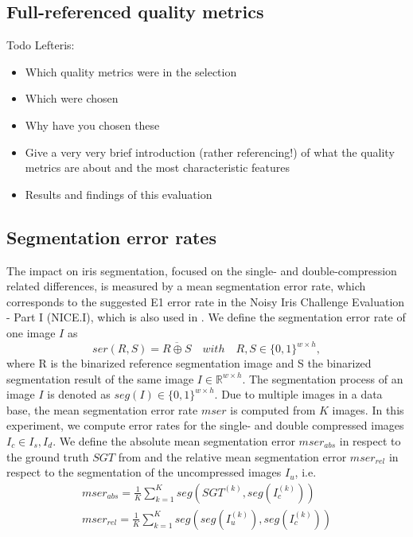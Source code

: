 \documentclass[10pt,twocolumn,letterpaper]{article}
\begin{document}
\subsection{Full-referenced quality metrics}
Todo Lefteris:
\begin{itemize}
 \item Which quality metrics were in the selection
 \item Which were chosen
 \item Why have you chosen these
 \item Give a very very brief introduction (rather referencing!) of what the quality metrics are about and the most characteristic features
 \item Results and findings of this evaluation
\end{itemize}

\subsection{Segmentation error rates}
The impact on iris segmentation, focused on the single- and double-compression related differences, is measured by a mean segmentation error rate, which corresponds to the suggested E1 error rate in the Noisy Iris Challenge Evaluation - Part I (NICE.I), which is also used in \cite{severeCompression}. We define the segmentation error rate of one image $I$ as
\begin{equation}
ser(R,S) = \overline{R \oplus S} \quad with \quad R,S \in \{0,1\}^{w \times h},
\end{equation} where R is the binarized reference segmentation image and S the binarized segmentation result of the same image $I \in \mathbb{R}^{w \times h}$. The segmentation process of an image $I$ is denoted as $seg(I) \in \{0,1\}^{w \times h}$. Due to multiple images in a data base, the mean segmentation error rate $mser$ is computed from $K$ images. In this experiment, we compute error rates for the single- and double compressed images $I_c \in {I_s, I_d}$. We define the absolute mean segmentation error $mser_{abs}$ in respect to the ground truth $SGT$ from \cite{severeCompression} and the relative mean segmentation error $mser_{rel}$ in respect to the segmentation of the uncompressed images $I_u$, i.e. 
\begin{eqnarray}
mser_{abs} = \frac{1}{K}\sum_{k=1}^{K}seg(SGT^{(k)},seg(I_c^{(k)})) \\
mser_{rel} = \frac{1}{K}\sum_{k=1}^{K}seg(seg(I_u^{(k)}),seg(I_c^{(k)}))
\end{eqnarray}
\end{document}
